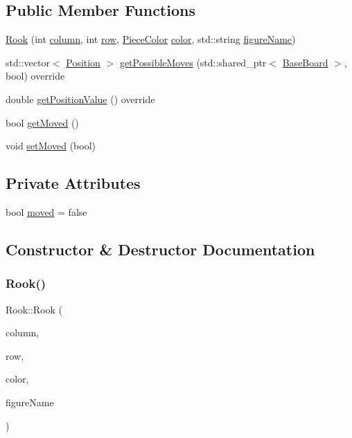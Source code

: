 \subsection*{Public Member Functions}
\begin{DoxyCompactItemize}
\item 
\hyperlink{class_rook_a757e308feb1c2d2635e8beb6d9b23369}{Rook} (int \hyperlink{class_piece_aa8f39e11280395103164f6ae07398c82}{column}, int \hyperlink{class_piece_ac6ef7c474f20562cb629c2452ce0631d}{row}, \hyperlink{_piece_8h_ad7595c48bb74c0dd2a7648712a2d4985}{Piece\+Color} \hyperlink{class_piece_a8dfe0501fe95a1a7618cf5ad3b9fda69}{color}, std\+::string \hyperlink{class_piece_af2fe809fd0d35d167f2419768e49fd3a}{figure\+Name})
\item 
std\+::vector$<$ \hyperlink{struct_position}{Position} $>$ \hyperlink{class_rook_ab186037a1f596102d618c1c9df31490d}{get\+Possible\+Moves} (std\+::shared\+\_\+ptr$<$ \hyperlink{class_base_board}{Base\+Board} $>$, bool) override
\item 
double \hyperlink{class_rook_ab1d83e6acb838249647f1f5fa7d17f41}{get\+Position\+Value} () override
\item 
bool \hyperlink{class_rook_a63c6d35a7f51e24d17079c80980dd948}{get\+Moved} ()
\item 
void \hyperlink{class_rook_a3ce8295607d89754d8c4be1813bc7b70}{set\+Moved} (bool)
\end{DoxyCompactItemize}
\subsection*{Private Attributes}
\begin{DoxyCompactItemize}
\item 
bool \hyperlink{class_rook_a2066de8a5df66bf3b8089d9d33e079ab}{moved} = false
\end{DoxyCompactItemize}


\subsection{Constructor \& Destructor Documentation}
\mbox{\label{class_rook_a757e308feb1c2d2635e8beb6d9b23369}} 
\subsubsection{\texorpdfstring{Rook()}{Rook()}}
{\footnotesize\ttfamily Rook\+::\+Rook (\begin{DoxyParamCaption}\item[{int}]{column,  }\item[{int}]{row,  }\item[{\hyperlink{_piece_8h_ad7595c48bb74c0dd2a7648712a2d4985}{Piece\+Color}}]{color,  }\item[{std\+::string}]{figure\+Name }\end{DoxyParamCaption})\hspace{0.3cm}{\ttfamily [inline]}}



